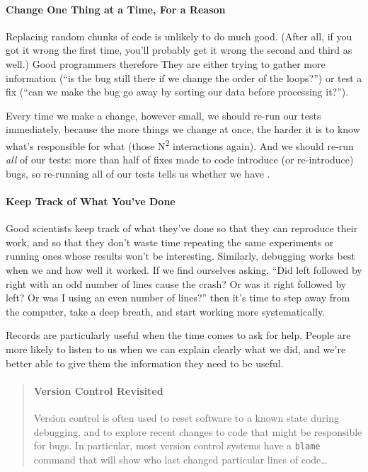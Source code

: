 \documentclass{book}
\begin{document}
\mbox{}\paragraph{Change One Thing at a Time, For a Reason}

Replacing random chunks of code is unlikely to do much good. (After all,
if you got it wrong the first time, you'll probably get it wrong the
second and third as well.) Good programmers therefore
 They are either trying to gather more information
(``is the bug still there if we change the order of the loops?'') or
test a fix (``can we make the bug go away by sorting our data before
processing it?'').

Every time we make a change, however small, we should re-run our tests
immediately, because the more things we change at once, the harder it is
to know what's responsible for what (those N\textsuperscript{2}
interactions again). And we should re-run \emph{all} of our tests: more
than half of fixes made to code introduce (or re-introduce) bugs, so
re-running all of our tests tells us whether we have
.

\mbox{}\paragraph{Keep Track of What You've Done}

Good scientists keep track of what they've done so that they can
reproduce their work, and so that they don't waste time repeating the
same experiments or running ones whose results won't be interesting.
Similarly, debugging works best when we
 and how well it worked. If we find ourselves asking,
``Did left followed by right with an odd number of lines cause the
crash? Or was it right followed by left? Or was I using an even number
of lines?'' then it's time to step away from the computer, take a deep
breath, and start working more systematically.

Records are particularly useful when the time comes to ask for help.
People are more likely to listen to us when we can explain clearly what
we did, and we're better able to give them the information they need to
be useful.

\begin{quote}
\mbox{}\paragraph{Version Control Revisited}

Version control is often used to reset software to a known state during
debugging, and to explore recent changes to code that might be
responsible for bugs. In particular, most version control systems have a
\texttt{blame} command that will show who last changed particular lines
of code\ldots{}
\end{quote}
\end{document}
